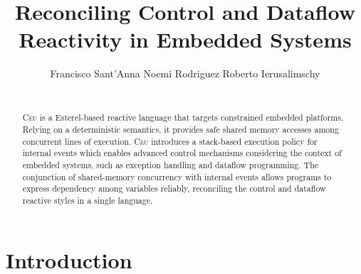 \documentclass{acm_proc_article-sp}
\newcommand{\CEU}{\textsc{C\'{e}u}\xspace}
\newcommand{\1}{\;}
\newcommand{\2}{\;\;}
\newcommand{\3}{\;\;\;}
\newcommand{\5}{\;\;\;\;\;}
\begin{document}
\title {
    Reconciling Control and Dataflow Reactivity in Embedded Systems
}

\author{
    \alignauthor
    Francisco Sant'Anna \hspace{1cm} Noemi Rodriguez \hspace{1cm} Roberto Ierusalimschy   \\
     \\
}

\maketitle

\begin{abstract}
\CEU is a Esterel-based reactive language that targets constrained embedded 
platforms.
%
Relying on a deterministic semantics, it provides safe shared memory accesses 
among concurrent lines of execution.
%
\CEU introduces a stack-based execution policy for internal events which 
enables advanced control mechanisms considering the context of embedded 
systems, such as exception handling and dataflow programming.
%
The conjunction of shared-memory concurrency with internal events allows 
programs to express dependency among variables reliably, reconciling the 
control and dataflow reactive styles in a single language.
%
\end{abstract}




\section{Introduction}

\end{document}
